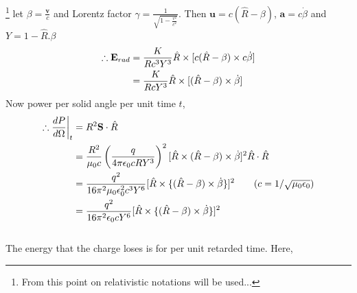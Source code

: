 \documentclass[11pt,a4paper]{article}
\begin{document}
\footnote{From this point on relativistic notations will be used...}
let $\beta = \frac{\mathbf{v}}{c}$ and Lorentz factor $\gamma = \frac{1}{\sqrt{1-\frac{v^2}{c^2}}}$.
Then $\mathbf{u} = c(\hat{R} - \beta)$, $\mathbf{a} = c\dot{\beta}$ and $Y=1-\hat{R}.\beta$
\begin{align}
    \therefore \mathbf{E}_{rad} &= \frac{K}{Rc^3Y^3} \hat{R} \times [c(\hat{R}-\beta) \times c\dot{\beta}] \notag \\
                                &= \frac{K}{RcY^3} \hat{R} \times [(\hat{R}-\beta) \times \dot{\beta}] \label{eq49}
\end{align}
Now power per solid angle per unit time $t$,
\begin{align}
    \therefore \frac{dP}{d\Omega}\biggl|_t &= R^2 \mathbf{S}\cdot \hat{R} \notag \\
                                           &= \frac{R^2}{\mu_0 c}\left( \frac{q}{4\pi \epsilon_0cRY^3} \right)^2[\hat{R} \times (\hat{R}-\beta)\times \dot{\beta}]^2 \hat{R}\cdot \hat{R} \notag \\
                                           &= \frac{q^2}{16\pi^2\mu_0 \epsilon_0^2c^3Y^6}[\hat{R}\times \{ (\hat{R} - \beta) \times \dot{\beta} \}]^2 \tag{$c = 1/\sqrt{\mu_0 \epsilon_0}$} \\
                                           &= \frac{q^2}{16\pi^2 \epsilon_0cY^6}[\hat{R}\times \{ (\hat{R} - \beta) \times \dot{\beta} \}]^2 \label{eq50}
\end{align}
\\
The energy that the charge loses is for per unit retarded time. Here,
\end{document}
